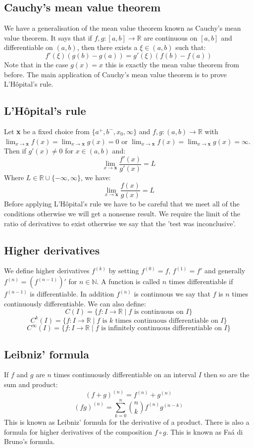 \documentclass[12pt]{article}
\begin{document}
\subsection*{Cauchy's mean value theorem}
We have a generalisation of the mean value theorem known as Cauchy's mean value theorem. It says that if \(f,g:[a,b]\to\mathbb{R}\) are continuous on \([a,b]\) and differentiable on \((a,b)\), then there exists a \(\xi\in (a,b)\) such that:
\[f'(\xi)(g(b)-g(a))=g'(\xi)(f(b)-f(a))\]
Note that in the case \(g(x)=x\) this is exactly the mean value theorem from before. The main application of Cauchy's mean value theorem is to prove L'H\^opital's rule.
\subsection*{L'H\^opital's rule}
Let \textbf{x} be a fixed choice from \(\{a^+,b^-,x_0,\infty\}\) and \(f,g:(a,b)\to\mathbb{R}\) with \(\lim_{x\to\textbf{x}}f(x)=\lim_{x\to\textbf{x}}g(x)=0\) or \(\lim_{x\to\textbf{x}}f(x)=\lim_{x\to\textbf{x}}g(x)=\infty\). Then if \(g'(x)\ne 0\) for \(x\in(a,b)\) and:
\[\lim_{x\to\textbf{x}}\frac{f'(x)}{g'(x)}=L\]
Where \(L\in\mathbb{R}\cup \{-\infty,\infty\}\), we have:
\[\lim_{x\to\textbf{x}}\frac{f(x)}{g(x)}=L\]
Before applying L'H\^opital's rule we have to be careful that we meet all of the conditions otherwise we will get a nonsense result. We require the limit of the ratio of derivatives to exist otherwise we say that the 'test was inconclusive'.
\subsection*{Higher derivatives}
We define higher derivatives \(f^{(k)}\) by setting \(f^{(0)}=f,\,f^{(1)}=f'\) and generally \(f^{(n)}=(f^{(n-1)})'\) for \(n\in\mathbb{N}\). A function is called \(n\) times differentiable if \(f^{(n-1)}\) is differentiable. In addition \(f^{(n)}\) is continuous we say that \(f\) is \(n\) times continuously differentiable. We can also define:
\[C(I)=\{f:I\to\mathbb{R}\mid f \text{ is continuous on }I\}\]
\[C^k(I)=\{f:I\to\mathbb{R}\mid f \text{ is } k \text{ times continuous differentiable on }I\}\]
\[C^\infty(I)=\{f:I\to\mathbb{R}\mid f \text{ is infinitely continuous differentiable on }I\}\]
\subsection*{Leibniz' formula}
If \(f\) and \(g\) are \(n\) times continuously differentiable on an interval \(I\) then so are the sum and product:
\[(f+g)^{(n)}=f^{(n)}+g^{(n)}\]
\[(fg)^{(n)}=\sum^n_{k=0}\binom{n}{k}f^{(n)}g^{(n-k)}\]
This is known as Leibniz' formula for the derivative of a product. There is also a formula for higher derivatives of the composition \(f\circ g\). This is known as Fa\'a di Bruno's formula.
\end{document}
